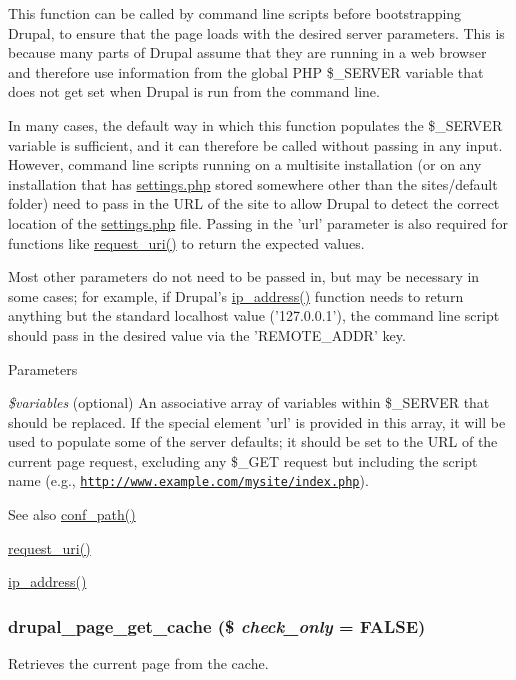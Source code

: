 This function can be called by command line scripts before bootstrapping Drupal, to ensure that the page loads with the desired server parameters. This is because many parts of Drupal assume that they are running in a web browser and therefore use information from the global PHP \$\_\-SERVER variable that does not get set when Drupal is run from the command line.

In many cases, the default way in which this function populates the \$\_\-SERVER variable is sufficient, and it can therefore be called without passing in any input. However, command line scripts running on a multisite installation (or on any installation that has \hyperlink{settings_8php}{settings.php} stored somewhere other than the sites/default folder) need to pass in the URL of the site to allow Drupal to detect the correct location of the \hyperlink{settings_8php}{settings.php} file. Passing in the 'url' parameter is also required for functions like \hyperlink{bootstrap_8inc_a80b52d5331d840440b5e3dfe82dd7ea2}{request\_\-uri()} to return the expected values.

Most other parameters do not need to be passed in, but may be necessary in some cases; for example, if Drupal's \hyperlink{bootstrap_8inc_aec2f772317b4fb79cc696412c2e455c3}{ip\_\-address()} function needs to return anything but the standard localhost value ('127.0.0.1'), the command line script should pass in the desired value via the 'REMOTE\_\-ADDR' key.


\begin{DoxyParams}{Parameters}
\item[{\em \$variables}](optional) An associative array of variables within \$\_\-SERVER that should be replaced. If the special element 'url' is provided in this array, it will be used to populate some of the server defaults; it should be set to the URL of the current page request, excluding any \$\_\-GET request but including the script name (e.g., \href{http://www.example.com/mysite/index.php}{\tt http://www.example.com/mysite/index.php}).\end{DoxyParams}
\begin{DoxySeeAlso}{See also}
\hyperlink{bootstrap_8inc_acef612ef19c49f6259531f0bee5c26cc}{conf\_\-path()} 

\hyperlink{bootstrap_8inc_a80b52d5331d840440b5e3dfe82dd7ea2}{request\_\-uri()} 

\hyperlink{bootstrap_8inc_aec2f772317b4fb79cc696412c2e455c3}{ip\_\-address()} 
\end{DoxySeeAlso}
\hypertarget{bootstrap_8inc_ae0a2f358a39764e08d16be76415b367f}{
\subsubsection[{drupal\_\-page\_\-get\_\-cache}]{\setlength{\rightskip}{0pt plus 5cm}drupal\_\-page\_\-get\_\-cache (\$ {\em check\_\-only} = {\ttfamily FALSE})}}
\label{bootstrap_8inc_ae0a2f358a39764e08d16be76415b367f}
Retrieves the current page from the cache.

